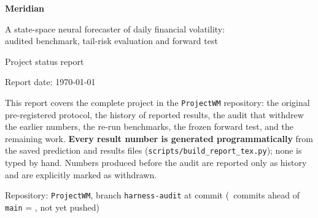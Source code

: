 \documentclass[11pt,a4paper]{article}
\begin{document}
\begin{titlepage}
\centering
\vspace*{2.2cm}
{\Huge\bfseries\color{accent} Meridian\par}
\vspace{0.5cm}
{\Large A state-space neural forecaster of daily financial volatility:\\[2pt]
audited benchmark, tail-risk evaluation and forward test\par}
\vspace{1.2cm}
{\large Project status report\par}
\vspace{0.3cm}
{\normalsize Report date: \today\par}
\vspace{1.6cm}
\begin{minipage}{0.86\linewidth}
\begin{keybox}
This report covers the complete project in the \texttt{ProjectWM} repository: the original
pre-registered protocol, the history of reported results, the audit that withdrew the earlier
numbers, the re-run benchmarks, the frozen forward test, and the remaining work.
\textbf{Every result number is generated programmatically} from the saved prediction and results
files (\texttt{scripts/build\_report\_tex.py}); none is typed by hand. Numbers produced before the
audit are reported only as history and are explicitly marked as withdrawn.
\end{keybox}
\end{minipage}
\vfill
{\small Repository: \texttt{ProjectWM}, branch \texttt{harness-audit} at commit \texttt{\GitHead}
(\GitAhead\ commits ahead of \texttt{main} = \texttt{\GitMain}, not yet pushed)\par}
\end{titlepage}
\end{document}
